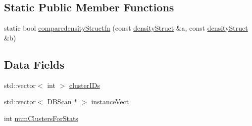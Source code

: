 \subsection*{Static Public Member Functions}
\begin{DoxyCompactItemize}
\item 
static bool \hyperlink{classDBScan_abf662378982ad01ee4b4b0e713887d42}{comparedensity\-Structfn} (const \hyperlink{structdensityStruct}{density\-Struct} \&a, const \hyperlink{structdensityStruct}{density\-Struct} \&b)
\end{DoxyCompactItemize}
\subsection*{Data Fields}
\begin{DoxyCompactItemize}
\item 
std\-::vector$<$ int $>$ \hyperlink{classDBScan_aa363c8aa510fcbd54979f16047d5f0a3}{cluster\-I\-Ds}
\item 
std\-::vector$<$ \hyperlink{classDBScan}{D\-B\-Scan} $\ast$ $>$ \hyperlink{classDBScan_a8270fd572c31089b33fff1e047c00633}{instance\-Vect}
\item 
int \hyperlink{classDBScan_abf8ba9bc0c2b8ff8fab4c9d070f78ec7}{num\-Clusters\-For\-Stats}
\end{DoxyCompactItemize}
